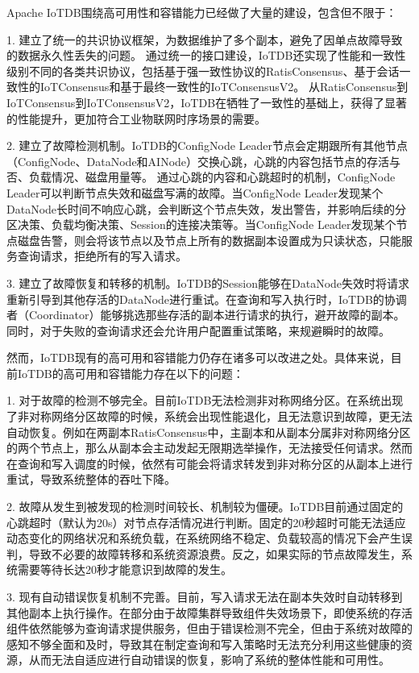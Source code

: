 Apache IoTDB围绕高可用性和容错能力已经做了大量的建设，包含但不限于：

1. 建立了统一的共识协议框架，为数据维护了多个副本，避免了因单点故障导致的数据永久性丢失的问题。
通过统一的接口建设，IoTDB还实现了性能和一致性级别不同的各类共识协议，包括基于强一致性协议的RatisConsensus、基于会话一致性的IoTConsensus和基于最终一致性的IoTConsensusV2。
从RatisConsensus到IoTConsensus到IoTConsensusV2，IoTDB在牺牲了一致性的基础上，获得了显著的性能提升，更加符合工业物联网时序场景的需要。


2. 建立了故障检测机制。IoTDB的ConfigNode Leader节点会定期跟所有其他节点（ConfigNode、DataNode和AINode）交换心跳，心跳的内容包括节点的存活与否、负载情况、磁盘用量等。
通过心跳的内容和心跳超时的机制，ConfigNode Leader可以判断节点失效和磁盘写满的故障。当ConfigNode Leader发现某个DataNode长时间不响应心跳，会判断这个节点失效，发出警告，并影响后续的分区决策、负载均衡决策、Session的连接决策等。当ConfigNode Leader发现某个节点磁盘告警，则会将该节点以及节点上所有的数据副本设置成为只读状态，只能服务查询请求，拒绝所有的写入请求。

3. 建立了故障恢复和转移的机制。IoTDB的Session能够在DataNode失效时将请求重新引导到其他存活的DataNode进行重试。在查询和写入执行时，IoTDB的协调者（Coordinator）能够挑选那些存活的副本进行请求的执行，避开故障的副本。同时，对于失败的查询请求还会允许用户配置重试策略，来规避瞬时的故障。


然而，IoTDB现有的高可用和容错能力仍存在诸多可以改进之处。具体来说，目前IoTDB的高可用和容错能力存在以下的问题：

1. 对于故障的检测不够完全。目前IoTDB无法检测非对称网络分区。在系统出现了非对称网络分区故障的时候，系统会出现性能退化，且无法意识到故障，更无法自动恢复。例如在两副本RatisConsensus中，主副本和从副本分属非对称网络分区的两个节点上，那么从副本会主动发起无限期选举操作，无法接受任何请求。然而在查询和写入调度的时候，依然有可能会将请求转发到非对称分区的从副本上进行重试，导致系统整体的吞吐下降。


2. 故障从发生到被发现的检测时间较长、机制较为僵硬。IoTDB目前通过固定的心跳超时（默认为20s）对节点存活情况进行判断。固定的20秒超时可能无法适应动态变化的网络状况和系统负载，在系统网络不稳定、负载较高的情况下会产生误判，导致不必要的故障转移和系统资源浪费。反之，如果实际的节点故障发生，系统需要等待长达20秒才能意识到故障的发生。

3. 现有自动错误恢复机制不完善。目前，写入请求无法在副本失效时自动转移到其他副本上执行操作。在部分由于故障集群导致组件失效场景下，即使系统的存活组件依然能够为查询请求提供服务，但由于错误检测不完全，但由于系统对故障的感知不够全面和及时，导致其在制定查询和写入策略时无法充分利用这些健康的资源，从而无法自适应进行自动错误的恢复，影响了系统的整体性能和可用性。


